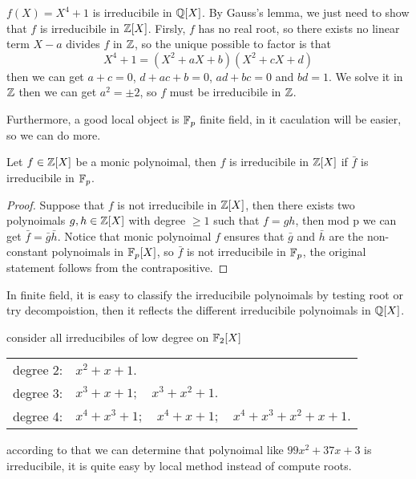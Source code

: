 \documentclass[en,geye,blue,normal,12pt]{elegantnote}
\begin{document}
\begin{example}
   \(f(X) = X^4+1\) is irreducibile in \(\mathbb{Q}[X]\). By Gauss's lemma, we just need to show that \(f\) is irreducibile in \(\mathbb{Z}[X]\). Firsly, \(f\) has no real root, so there exists no linear term \(X-a\) divides \(f\) in \(\mathbb{Z}\), so the unique possible to factor is that
   \[X^4+1 = (X^2+aX+b)(X^2+cX+d)\]
   then we can get \(a+c = 0\), \(d+ac+b=0\), \(ad+bc=0\) and \(bd=1\). We solve it in \(\mathbb{Z}\) then we can get \(a^2 = \pm 2\), so \(f\) must be irreducibile in \(\mathbb{Z}\).
\end{example}

Furthermore, a good local object is \(\mathbb{F}_p\) finite field, in it caculation will be easier, so we can do more.

\begin{proposition}
  Let \(f \in \mathbb{Z}[X]\) be a monic polynoimal, then \(f\) is irreducibile in \(\mathbb{Z}[X]\) if \(\bar{f}\) is irreducibile in \(\mathbb{F}_p\).

  \begin{proof}
    Suppose that \(f\) is not irreducibile in \(\mathbb{Z}[X]\), then there exists two polynoimals \(g,h \in \mathbb{Z}[X]\) with degree \(\geq 1\) such that \(f = gh\), then mod p we can get \(\bar{f} = \bar{g}\bar{h}\). Notice that monic polynoimal \(f\) ensures that \(\bar{g}\) and \(\bar{h}\) are the non-constant polynoimals in \(\mathbb{F}_p[X]\), so \(\bar{f}\) is not irreducibile in \(\mathbb{F}_p\), the original statement follows from the contrapositive.
  \end{proof}
\end{proposition}

In finite field, it is easy to classify the irreducibile polynoimals by testing root or try decompoistion, then it reflects the different irreducibile polynoimals in \(\mathbb{Q}[X]\).
\begin{example}
  consider all irreducibiles of low degree on \(\mathbb{F}_2[X]\)

\begin{tabular}{ll}
degree 2: & \( x^2 + x + 1. \) \\
degree 3: & \( x^3 + x + 1; \quad x^3 + x^2 + 1. \) \\
degree 4: & \( x^4 + x^3 + 1; \quad x^4 + x + 1; \quad x^4 + x^3 + x^2 + x + 1. \)
\end{tabular}

according to that we can determine that polynoimal like \(99x^2+37x+3\) is irreducibile, it is quite easy by local method instead of compute roots.
\end{example}
\end{document}
